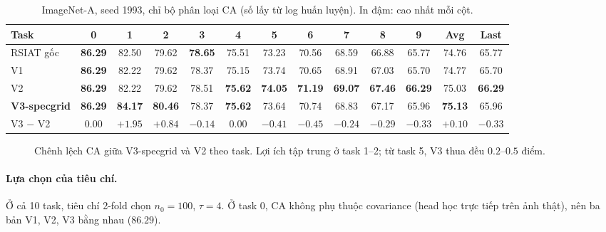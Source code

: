 \documentclass[11pt]{article}
\begin{document}
\begin{table}[H]
\centering\small
\caption{ImageNet-A, seed 1993, chỉ bộ phân loại CA (số lấy từ log huấn luyện). In đậm: cao nhất mỗi cột.}
\label{tab:ca1993}
\setlength{\tabcolsep}{3.6pt}
\begin{tabular}{l*{10}{c}cc}
\toprule
Task & 0 & 1 & 2 & 3 & 4 & 5 & 6 & 7 & 8 & 9 & Avg & Last \\
\midrule
RSIAT gốc & \textbf{86.29} & 82.50 & 79.62 & \textbf{78.65} & 75.51 & 73.23 & 70.56 & 68.59 & 66.88 & 65.77 & 74.76 & 65.77 \\
V1 & \textbf{86.29} & 82.22 & 79.62 & 78.37 & 75.15 & 73.74 & 70.65 & 68.91 & 67.03 & 65.70 & 74.77 & 65.70 \\
V2 & \textbf{86.29} & 82.22 & 79.62 & 78.51 & \textbf{75.62} & \textbf{74.05} & \textbf{71.19} & \textbf{69.07} & \textbf{67.46} & \textbf{66.29} & 75.03 & \textbf{66.29} \\
\textbf{V3-specgrid} & \textbf{86.29} & \textbf{84.17} & \textbf{80.46} & 78.37 & \textbf{75.62} & 73.64 & 70.74 & 68.83 & 67.17 & 65.96 & \textbf{75.13} & 65.96 \\
\midrule
V3 $-$ V2 & 0.00 & $+1.95$ & $+0.84$ & $-0.14$ & 0.00 & $-0.41$ & $-0.45$ & $-0.24$ & $-0.29$ & $-0.33$ & $+0.10$ & $-0.33$ \\
\bottomrule
\end{tabular}
\end{table}

\begin{figure}[H]
\centering
{}
\caption{Chênh lệch CA giữa V3-specgrid và V2 theo task. Lợi ích tập trung ở task 1--2; từ task 5, V3 thua đều
$0.2$--$0.5$ điểm.}
\label{fig:cadiff}
\end{figure}

\paragraph{Lựa chọn của tiêu chí.} Ở cả 10 task, tiêu chí 2-fold chọn $n_0=100$, $\tau=4$. Ở task 0, CA không phụ thuộc
covariance (head học trực tiếp trên ảnh thật), nên ba bản V1, V2, V3 bằng nhau ($86.29$).
\end{document}
